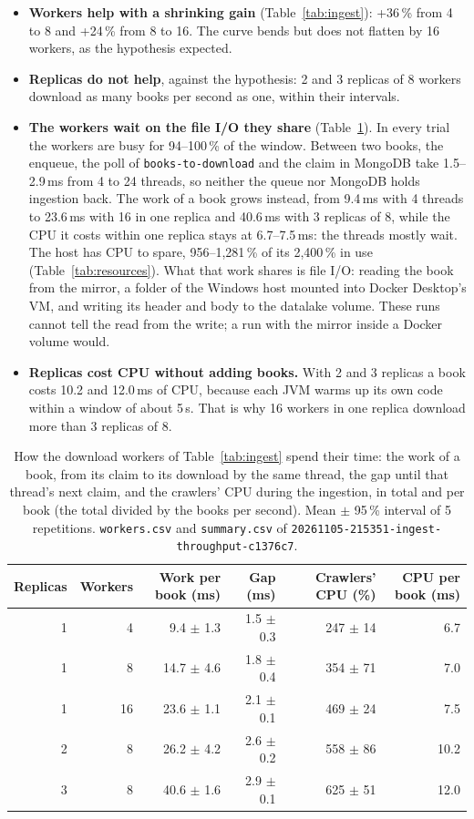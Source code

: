 \documentclass[11pt,a4paper]{article}
\newcommand{\code}[1]{\nolinkurl{#1}}
\newcommand{\run}[1]{\nolinkurl{#1}}
\begin{document}
\begin{itemize}
\item \textbf{Workers help with a shrinking gain} (Table~\ref{tab:ingest}): +36\,\% from 4 to 8 and +24\,\% from 8 to
  16. The curve bends but does not flatten by 16 workers, as the hypothesis expected.
\item \textbf{Replicas do not help}, against the hypothesis: 2 and 3 replicas of 8 workers download as many books per
  second as one, within their intervals.
\item \textbf{The workers wait on the file I/O they share} (Table~\ref{tab:ingest-workers}). In every trial the
  workers are busy for 94--100\,\% of the window. Between two books, the enqueue, the poll of \code{books-to-download}
  and the claim in MongoDB take 1.5--2.9\,ms from 4 to 24 threads, so neither the queue nor MongoDB holds ingestion
  back. The work of a book grows instead, from 9.4\,ms with 4 threads to 23.6\,ms with 16 in one replica and 40.6\,ms
  with 3 replicas of 8, while the CPU it costs within one replica stays at 6.7--7.5\,ms: the threads mostly wait. The
  host has CPU to spare, 956--1{,}281\,\% of its 2{,}400\,\% in use (Table~\ref{tab:resources}). What that work shares is
  file I/O: reading the book from the mirror, a folder of the Windows host mounted into Docker Desktop's VM, and writing
  its header and body to the datalake volume. These runs cannot tell the read from the write; a run with the mirror
  inside a Docker volume would.
\item \textbf{Replicas cost CPU without adding books.} With 2 and 3 replicas a book costs 10.2 and 12.0\,ms of CPU,
  because each JVM warms up its own code within a window of about 5\,s. That is why 16 workers in one replica download
  more than 3 replicas of 8.
\end{itemize}

\begin{table}[ht]
\centering
\small
\caption{How the download workers of Table~\ref{tab:ingest} spend their time: the work of a book, from its claim to its
download by the same thread, the gap until that thread's next claim, and the crawlers' CPU during the ingestion, in
total and per book (the total divided by the books per second). Mean $\pm$ 95\,\% interval of 5 repetitions.
\code{workers.csv} and \code{summary.csv} of \run{20261105-215351-ingest-throughput-c1376c7}.}
\label{tab:ingest-workers}
\begin{tabular}{@{}rrrrrr@{}}
\toprule
Replicas & Workers & Work per book (ms) & Gap (ms) & Crawlers' CPU (\%) & CPU per book (ms) \\
\midrule
1 & 4 & 9.4 $\pm$ 1.3 & 1.5 $\pm$ 0.3 & 247 $\pm$ 14 & 6.7 \\
1 & 8 & 14.7 $\pm$ 4.6 & 1.8 $\pm$ 0.4 & 354 $\pm$ 71 & 7.0 \\
1 & 16 & 23.6 $\pm$ 1.1 & 2.1 $\pm$ 0.1 & 469 $\pm$ 24 & 7.5 \\
2 & 8 & 26.2 $\pm$ 4.2 & 2.6 $\pm$ 0.2 & 558 $\pm$ 86 & 10.2 \\
3 & 8 & 40.6 $\pm$ 1.6 & 2.9 $\pm$ 0.1 & 625 $\pm$ 51 & 12.0 \\
\bottomrule
\end{tabular}
\end{table}
\end{document}
